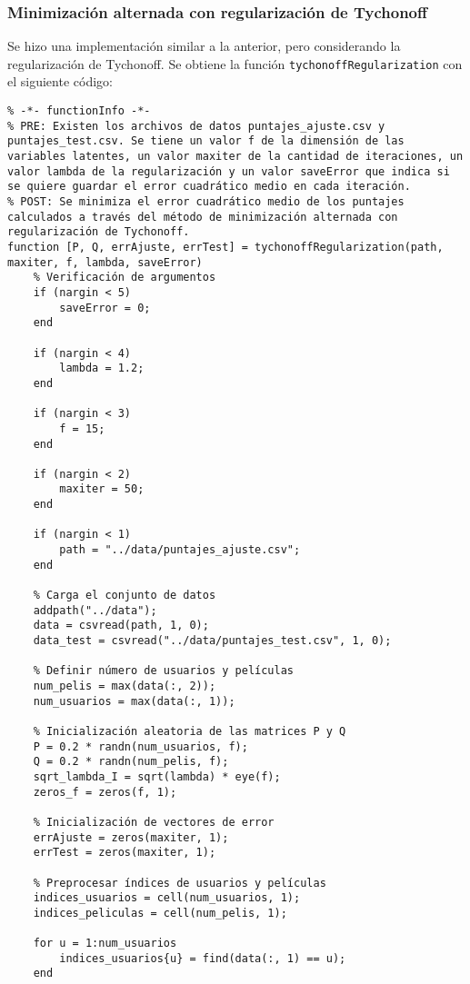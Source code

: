 \documentclass[12pt,a4paper]{article}
\begin{document}
\subsubsection*{Minimización alternada con regularización de Tychonoff}
Se hizo una implementación similar a la anterior, pero considerando la regularización de Tychonoff. Se obtiene la función \texttt{tychonoffRegularization} con el siguiente código:
\begin{lstlisting}
% -*- functionInfo -*-
% PRE: Existen los archivos de datos puntajes_ajuste.csv y puntajes_test.csv. Se tiene un valor f de la dimensión de las variables latentes, un valor maxiter de la cantidad de iteraciones, un valor lambda de la regularización y un valor saveError que indica si se quiere guardar el error cuadrático medio en cada iteración.
% POST: Se minimiza el error cuadrático medio de los puntajes calculados a través del método de minimización alternada con regularización de Tychonoff.
function [P, Q, errAjuste, errTest] = tychonoffRegularization(path, maxiter, f, lambda, saveError)
    % Verificación de argumentos
    if (nargin < 5)
        saveError = 0;
    end

    if (nargin < 4)
        lambda = 1.2;
    end

    if (nargin < 3)
        f = 15;
    end

    if (nargin < 2)
        maxiter = 50;
    end

    if (nargin < 1)
        path = "../data/puntajes_ajuste.csv";
    end

    % Carga el conjunto de datos
    addpath("../data");
    data = csvread(path, 1, 0);
    data_test = csvread("../data/puntajes_test.csv", 1, 0);

    % Definir número de usuarios y películas
    num_pelis = max(data(:, 2));
    num_usuarios = max(data(:, 1));

    % Inicialización aleatoria de las matrices P y Q
    P = 0.2 * randn(num_usuarios, f);
    Q = 0.2 * randn(num_pelis, f);
    sqrt_lambda_I = sqrt(lambda) * eye(f);
    zeros_f = zeros(f, 1);

    % Inicialización de vectores de error
    errAjuste = zeros(maxiter, 1);
    errTest = zeros(maxiter, 1);

    % Preprocesar índices de usuarios y películas
    indices_usuarios = cell(num_usuarios, 1);
    indices_peliculas = cell(num_pelis, 1);

    for u = 1:num_usuarios
        indices_usuarios{u} = find(data(:, 1) == u);
    end


\end{lstlisting}
\end{document}
